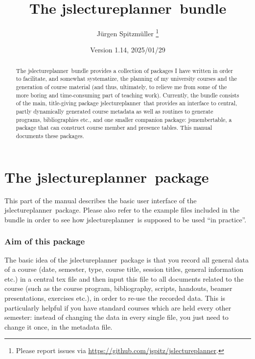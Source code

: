 \documentclass[english]{article}
\newcommand*\jslp{\textsf{jslectureplanner}}
\newcommand*\jsmt{\textsf{jsmembertable}}
\begin{document}
\title{The \jslp\ bundle}

\author{Jürgen Spitzmüller%
\thanks{Please report issues via \protect\url{https://github.com/jspitz/jslectureplanner}.}}

\date{Version 1.14, 2025/01/29}

\maketitle

\begin{abstract}
\noindent The \jslp\ bundle provides a collection of packages
I have written in order to facilitate, and somewhat systematize,
the planning of my university courses and the generation of course material
(and thus, ultimately, to relieve me from some of the more boring and
time-consuming part of teaching work).
Currently, the bundle consists of the main, title-giving package \jslp\
that provides an interface to central, partly dynamically generated course
metadata as well as routines to generate programs, bibliographies etc., and one
smaller companion package: \jsmt, a package that can construct course
member and presence tables. This manual documents these packages.
\end{abstract}

\tableofcontents

\clearpage

\part{The \jslp\ package}

This part of the manual describes the basic user interface of the
\jslp\ package.
Please also refer to the example files included in the bundle in order to
see how \jslp\ is supposed to be used ``in practice''.

\section{Aim of this package}

The basic idea of the \jslp\ package is that you record
all general data of a course (date, semester, type, course title, session titles,
general information etc.) in a central tex file and then input this
file to all documents related to the course (such as the course program,
bibliography, scripts, handouts, beamer presentations, exercises etc.),
in order to re-use the recorded data.
This is particularly helpful if you have standard courses which
are held every other semester: instead of changing the data in every
single file, you just need to change it once, in the metadata file.
\end{document}

